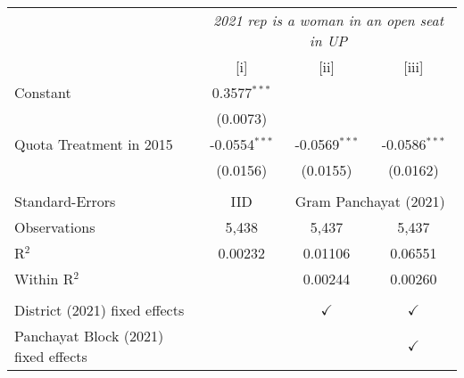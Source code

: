 
\begingroup
\centering
\begin{tabular}{lccc}
   \toprule
    & \multicolumn{3}{c}{\textit{2021 rep is a woman in an open seat in UP}}\\
                                        & [i]             & [ii]            & [iii]\\  
   \midrule 
   Constant                             & 0.3577$^{***}$  &                 &   \\   
                                        & (0.0073)        &                 &   \\   
   Quota Treatment in 2015              & -0.0554$^{***}$ & -0.0569$^{***}$ & -0.0586$^{***}$\\   
                                        & (0.0156)        & (0.0155)        & (0.0162)\\   
    \\
   Standard-Errors & IID & \multicolumn{2}{c}{Gram Panchayat (2021)} \\ 
   Observations                         & 5,438           & 5,437           & 5,437\\  
   R$^2$                                & 0.00232         & 0.01106         & 0.06551\\  
   Within R$^2$                         &                 & 0.00244         & 0.00260\\  
    \\
   District (2021) fixed effects        &                 & $\checkmark$    & $\checkmark$\\   
   Panchayat Block (2021) fixed effects &                 &                 & $\checkmark$\\   
   \bottomrule
\end{tabular}
\par\endgroup


